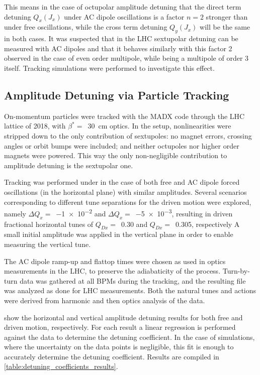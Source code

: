 This means in the case of octupolar amplitude detuning that the direct term detuning \(Q_{x}(J_{x})\) under AC dipole oscillations is a factor \(n = 2\) stronger than under free oscillations, while the cross term detuning \(Q_{y}(J_{x})\) will be the same in both cases.
It was suspected that in the LHC sextupolar detuning can be measured with AC dipoles and that it behaves similarly with this factor \num{2} observed in the case of even order multipole, while being a multipole of order \num{3} itself.
Tracking simulations were performed to investigate this effect.

\subsection*{Amplitude Detuning via Particle Tracking}

On-momentum particles were tracked with the \gls{MADX} code through the LHC lattice of \num{2018}, with \(\beta^{\ast} =\)~\qty{30}{\centi\meter} optics.
In the setup, nonlinearities were stripped down to the only contribution of sextupoles: no magnet errors, crossing angles or orbit bumps were included; and neither octupoles nor higher order magnets were powered.
This way the only non-negligible contribution to amplitude detuning is the sextupolar one.

Tracking was performed under in the case of both free and AC dipole forced oscillations (in the horizontal plane) with similar amplitudes.
Several scenarios corresponding to different tune separations for the driven motion were explored, namely \(\Delta Q_x =\)~\num{-1e-2} and \(\Delta Q_x =\)~\num{-5e-3}, resulting in driven fractional horizontal tunes of \(Q_{Dx} =\)~\num{0.30} and \(Q_{Dx} =\)~\num{0.305}, respectively
A small initial amplitude was applied in the vertical plane in order to enable measuring the vertical tune.

The AC dipole ramp-up and flattop times were chosen as used in optics measurements in the LHC, to preserve the adiabaticity of the process.
Turn-by-turn data was gathered at all BPMs during the tracking, and the resulting file was analyzed as done for LHC measurements.
Both the natural tunes and actions were derived from harmonic and then optics analysis of the data.

 show the horizontal and vertical amplitude detuning results for both free and driven motion, respectively.
For each result a linear regression is performed against the data to determine the detuning coefficient.
In the case of simulations, where the uncertainty on the data points is negligible, this fit is enough to accurately determine the detuning coefficient.
Results are compiled in \cref{table:detuning_coefficients_results}.


